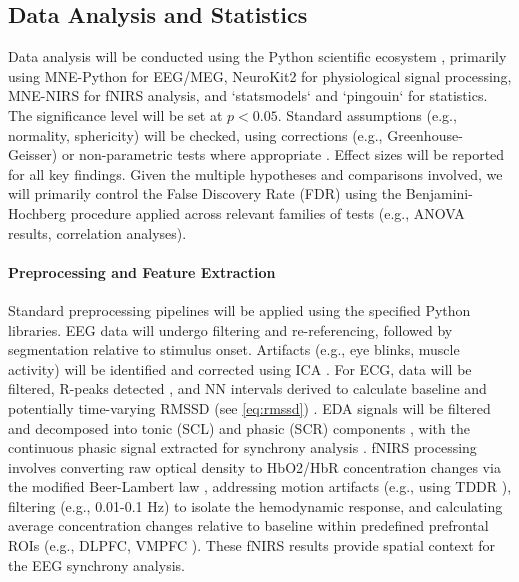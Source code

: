 \documentclass[12pt]{article} %
\begin{document}
\subsection{Data Analysis and Statistics} %
Data analysis will be conducted using the Python scientific ecosystem \parencite{harrisArrayProgrammingNumPy2020, virtanenSciPy10Fundamental2020}, primarily using MNE-Python \parencite{gramfortMEGEEGData2013} for EEG/MEG, NeuroKit2 \parencite{makowskiNeuroKit2PythonToolbox2021} for physiological signal processing, MNE-NIRS \parencite{yucelBestPracticesFNIRS2021} for fNIRS analysis, and `statsmodels` \parencite{seaboldStatsmodelsEconometricStatistical2010} and `pingouin` \parencite{vallatPingouinStatisticsPython2018} for statistics. The significance level will be set at $p < 0.05$. Standard assumptions (e.g., normality, sphericity) will be checked, using corrections (e.g., Greenhouse-Geisser) or non-parametric tests where appropriate \parencite{fieldDiscoveringStatisticsUsing2024}. Effect sizes will be reported for all key findings. Given the multiple hypotheses and comparisons involved, we will primarily control the False Discovery Rate (FDR) using the Benjamini-Hochberg procedure \parencite{benjaminiControllingFalseDiscovery1995} applied across relevant families of tests (e.g., ANOVA results, correlation analyses).

\paragraph{Preprocessing and Feature Extraction}
Standard preprocessing pipelines will be applied using the specified Python libraries. \gls{EEG} data will undergo filtering and re-referencing, followed by segmentation relative to stimulus onset. Artifacts (e.g., eye blinks, muscle activity) will be identified and corrected using \gls{ICA} \parencite{delormeEEGLABOpenSource2004}. For \gls{ECG}, data will be filtered, R-peaks detected \parencite{panRealTimeQRSDetection1985}, and \gls{NN intervals} derived to calculate baseline and potentially time-varying \gls{RMSSD} (see \autoref{eq:rmssd}) \parencite{malikHeartRateVariability1996}. \gls{EDA} signals will be filtered and decomposed into tonic (\gls{SCL}) and phasic (\gls{SCR}) components \parencite{benedekDecompositionSkinConductance2010}, with the continuous phasic signal extracted for synchrony analysis \parencite{boucseinElectrodermalActivity2012}. \gls{fNIRS} processing involves converting raw optical density to \gls{HbO2}/\gls{HbR} concentration changes via the modified Beer-Lambert law \parencite{copeSystemLongtermMeasurement1988}, addressing motion artifacts (e.g., using \gls{TDDR} \parencite{scholkmannReviewContinuousWave2014}), filtering (e.g., 0.01-0.1 Hz) to isolate the hemodynamic response, and calculating average concentration changes relative to baseline within predefined prefrontal \gls{ROI}s (e.g., \gls{DLPFC}, \gls{VMPFC} \parencite{etkinEmotionalProcessingAnterior2011, motzkinVentromedialPrefrontalCortex2015}). These \gls{fNIRS} results provide spatial context for the \gls{EEG} synchrony analysis.
\end{document}
